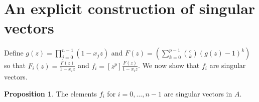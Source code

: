 \documentclass{amsart}
\numberwithin{equation}{section}
\theoremstyle{definition}
\newtheorem{proposition}[theorem]{Proposition}
\begin{document}

\section{An explicit construction of singular vectors}

Define $g(z)=\prod_{j=0}^{n-1} (1-x_jz)$ and $F(z) =\left(\sum_{k=0}^{p-1} \binom{c}{k} (g(z)-1)^k\right)$ so that $F_i(z) = \frac{F(z)}{1-x_iz}$ and $f_i = [z^p] \frac{F(z)}{1-x_iz}$.  We now show that $f_i$ are singular vectors.


\begin{proposition}\label{prop:ann} 
The elements $f_i$ for $i=0,\dots,n-1$ are singular vectors in $A$.
\end{proposition}
\end{document}
